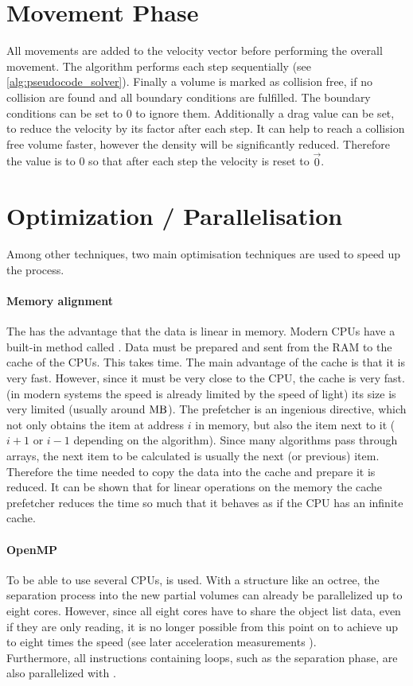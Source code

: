 \section{Movement Phase}
All movements are added to the velocity vector before performing the overall movement.
The algorithm performs each step sequentially (see \cref{alg:pseudocode_solver}).
% 
Finally a volume is marked as collision free, if no collision are found and all boundary conditions are fulfilled. 
The boundary conditions can be set to 0 to ignore them.
Additionally a drag value can be set, to reduce the velocity by its factor after each step.
It can help to reach a collision free volume faster, however the density will be significantly reduced.
Therefore the value is to 0 so that after each step the velocity is reset to $\vec{0}$. 
% 
\section{Optimization / Parallelisation}\label{sec:modelOpt}
% 
Among other techniques, two main optimisation techniques are used to speed up the process.
% 
\paragraph{Memory alignment}
The  has the advantage that the data is linear in memory.
Modern \acp{CPU} have a built-in method called .
Data must be prepared and sent from the \ac{RAM} to the cache of the \acp{CPU}.
This takes time.
The main advantage of the cache is that it is very fast.
However, since it must be very close to the \ac{CPU}, the cache is very fast. (in modern systems the speed is already limited by the speed of light) its size is very limited (usually around $\si{\mega\byte}$).
The prefetcher is an ingenious directive, which not only obtains the item at address $i$ in memory, but also the item next to it ($i+1$ or $i-1$ depending on the algorithm).
Since many algorithms pass through arrays, the next item to be calculated is usually the next (or previous) item.
Therefore the time needed to copy the data into the cache and prepare it is reduced.
It can be shown that for linear operations on the memory the cache prefetcher reduces the time so much that it behaves as if the \ac{CPU} has an infinite cache.
% 
\paragraph{OpenMP}
% 
To be able to use several \acp{CPU}, \openmp is used. With a structure like an octree, the separation process into the new partial volumes can already be parallelized up to eight cores.
However, since all eight cores have to share the object list data, even if they are only reading, it is no longer possible from this point on to achieve up to eight times the speed (see later acceleration measurements \dummy{}).
\\
% 
Furthermore, all instructions containing loops, such as the separation phase, are also parallelized with \openmp.
% 
% 
% 
